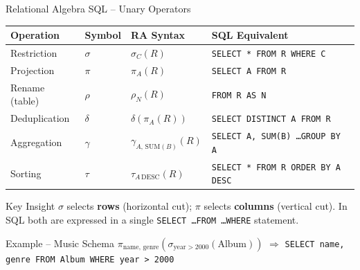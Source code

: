 \begin{frame}{Relational Algebra \textrightarrow{} SQL -- Unary Operators}
  \begin{center}
  \renewcommand{\arraystretch}{1.3}
  \begin{tabular}{@{}llll@{}}
    \toprule
    \textbf{Operation} & \textbf{Symbol} & \textbf{RA Syntax} & \textbf{SQL Equivalent} \\
    \midrule
    Restriction    & $\sigma$ & $\sigma_C(R)$                    & \texttt{SELECT * FROM R WHERE C} \\
    Projection     & $\pi$    & $\pi_A(R)$                       & \texttt{SELECT A FROM R} \\
    Rename (table) & $\rho$   & $\rho_N(R)$                      & \texttt{FROM R AS N} \\
    Deduplication  & $\delta$ & $\delta(\pi_A(R))$               & \texttt{SELECT DISTINCT A FROM R} \\
    Aggregation    & $\gamma$ & $\gamma_{A,\,\text{SUM}(B)}(R)$ & \texttt{SELECT A, SUM(B) \ldots GROUP BY A} \\
    Sorting        & $\tau$   & $\tau_{A\,\text{DESC}}(R)$      & \texttt{SELECT * FROM R ORDER BY A DESC} \\
    \bottomrule
  \end{tabular}
  \end{center}

  \begin{block}{Key Insight}
    $\sigma$ selects \textbf{rows} (horizontal cut); $\pi$ selects \textbf{columns} (vertical cut).
    In SQL both are expressed in a single \texttt{SELECT \ldots FROM \ldots WHERE} statement.
  \end{block}

  \begin{exampleblock}{Example -- Music Schema}
    $\pi_{\text{name, genre}}(\sigma_{\text{year} > 2000}(\text{Album}))$ \quad $\Rightarrow$ \quad
    \texttt{SELECT name, genre FROM Album WHERE year > 2000}
  \end{exampleblock}
\end{frame}

